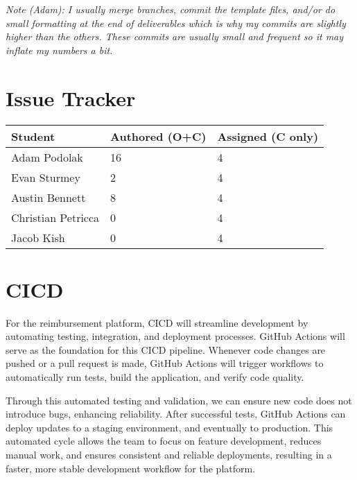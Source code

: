\documentclass{article}
\begin{document}

\textit{Note (Adam): I usually merge branches, commit the template files, and/or do small formatting at the end of deliverables which is why my commits are slightly higher than the others. These commits are usually small and frequent so it may inflate my numbers a bit.}

\section{Issue Tracker}


\begin{table}[H]
\centering
\begin{tabular}{lll}
\toprule
\textbf{Student} & \textbf{Authored (O+C)} & \textbf{Assigned (C only)}\\
\midrule
Adam Podolak & 16 & 4 \\
Evan Sturmey & 2 & 4 \\
Austin Bennett & 8 & 4 \\
Christian Petricca & 0 & 4 \\
Jacob Kish & 0 & 4 \\
\bottomrule
\end{tabular}
\end{table}


\section{CICD}

For the reimbursement platform, CICD will streamline development by automating testing, integration, and deployment processes. GitHub Actions will serve as the foundation for this CICD pipeline. Whenever code changes are pushed or a pull request is made, GitHub Actions will trigger workflows to automatically run tests, build the application, and verify code quality.

Through this automated testing and validation, we can ensure new code does not introduce bugs, enhancing reliability. After successful tests, GitHub Actions can deploy updates to a staging environment, and eventually to production. This automated cycle allows the team to focus on feature development, reduces manual work, and ensures consistent and reliable deployments, resulting in a faster, more stable development workflow for the platform.


\end{document}

